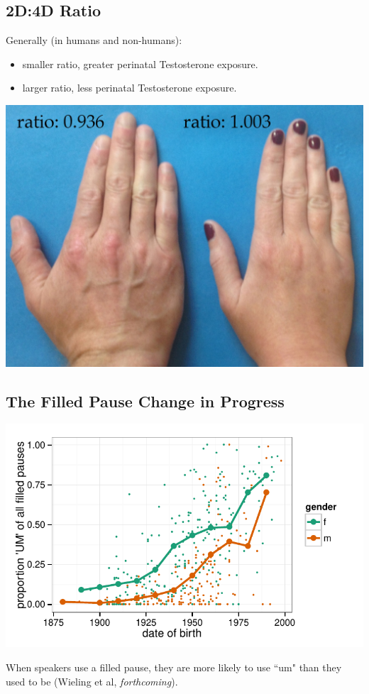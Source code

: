 \documentclass[a0,portrait]{a0poster}
\begin{document}
\begin{multicols}{2}
\subsection*{2D:4D Ratio}
Generally (in humans and non-humans):

\begin{itemize}
	\item smaller ratio, greater perinatal Testosterone exposure.
	\item larger ratio, less perinatal Testosterone exposure.
\end{itemize}
\begin{center}\vspace{1cm}
\includegraphics[width=0.8\linewidth]{realhands2.jpg}
\end{center}\vspace{1cm}


\subsection*{The Filled Pause Change in Progress}
\begin{minipage}[c]{0.70\linewidth}
\includegraphics[width=1\linewidth]{um.pdf}
\end{minipage}
%
\begin{minipage}[c]{0.25\linewidth}
\large
When speakers use a filled pause, they are more likely to use ``um" than they used to be  (Wieling et al, \textsl{forthcoming}).
\end{minipage}





\end{multicols}
\end{document}
